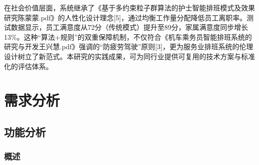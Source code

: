 \documentclass{ctexart}
\begin{document}
在社会价值层面，系统继承了《基于多约束粒子群算法的护士智能排班模式及效果研究陈蒙蒙.pdf》的人性化设计理念[5]，通过均衡工作量分配降低员工离职率。测试数据显示，员工满意度从72分（传统模式）提升至89分，家属满意度同步增长13\%。这种“算法+规则”的双重保障机制，不仅符合《机车乘务员智能排班系统的研究与开发王兴慧.pdf》强调的“防疲劳驾驶”原则[3]，更为服务业排班系统的伦理设计树立了新范式。本研究的实践成果，可为同行业提供可复用的技术方案与标准化的评估体系。

\section{需求分析}
\subsection{功能分析}
\subsubsection{概述}
\end{document}
